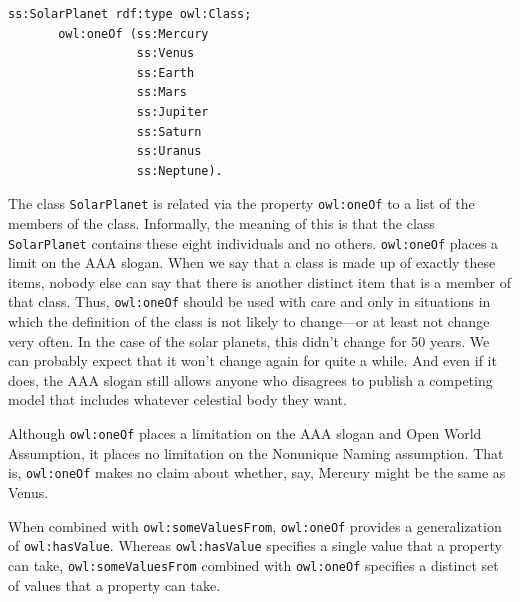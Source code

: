 \begin{lstlisting}
ss:SolarPlanet rdf:type owl:Class; 
       owl:oneOf (ss:Mercury
                  ss:Venus
                  ss:Earth
                  ss:Mars
                  ss:Jupiter
                  ss:Saturn
                  ss:Uranus
                  ss:Neptune).
\end{lstlisting}

The class \texttt{SolarPlanet} is related via the property \texttt{owl:oneOf} to a list of
the members of the class. Informally, the meaning of this is that the
class \texttt{SolarPlanet} contains these eight individuals and no others.
\texttt{owl:oneOf} places a limit on the AAA slogan. When we say that a class is
made up of exactly these items, nobody else can say that there is
another distinct item that is a member of that class. Thus, \texttt{owl:oneOf}
should be used with care and only in situations in which the definition
of the class is not likely to change---or at least not change very
often. In the case of the solar planets, this didn't change for 50
years. We can probably expect that it won't change again for quite a
while.  And even if it does, the AAA slogan still allows anyone who disagrees to publish a competing model 
that includes whatever celestial body they want. 

Although \texttt{owl:oneOf} places a limitation on the AAA slogan and Open World
Assumption, it places no limitation on the Nonunique Naming assumption.
That is, \texttt{owl:oneOf} makes no claim about whether, say, Mercury might be
the same as Venus.

When combined with \texttt{owl:someValuesFrom}, \texttt{owl:oneOf} provides a
generalization of \texttt{owl:hasValue}. Whereas \texttt{owl:hasValue} specifies a single
value that a property can take, \texttt{owl:someValuesFrom} combined with
\texttt{owl:oneOf} specifies a distinct set of values that a property can take.

